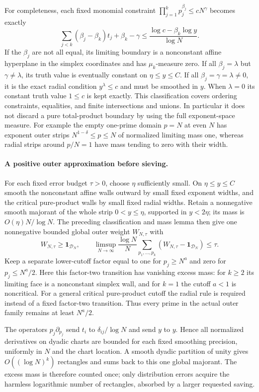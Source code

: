 For completeness, each fixed monomial constraint
$\prod_{j=1}^kp_j^{\beta_j}\le cN^\gamma$ becomes exactly
\[
 \sum_{j<k}(\beta_j-\beta_k)t_j+\beta_k-\gamma
 \le\frac{\log c-\beta_k\log y}{\log N}.
\]
If the $\beta_j$ are not all equal, its limiting boundary is a
nonconstant affine hyperplane in the simplex coordinates and has
$\mu_k$-measure zero. If all $\beta_j=\lambda$ but
$\gamma\ne\lambda$, its truth value is eventually constant on
$\eta\le y\le C$. If all $\beta_j=\gamma=\lambda\ne0$, it is
the exact radial condition $y^\lambda\le c$ and must be smoothed
in $y$. When $\lambda=0$ its constant truth value $1\le c$ is
kept exactly. This classification covers ordering constraints,
equalities, and finite intersections and unions. In particular it
does not discard a pure total-product boundary by using the full
exponent-space measure. For example the empty one-prime domain
$p=N$ at even $N$ has exponent outer strips
$N^{1-\delta}\le p\le N$ of normalized limiting mass one, whereas
radial strips around $p/N=1$ have mass tending to zero with their width.

\paragraph{A positive outer approximation before sieving.}
For each fixed error budget $\tau>0$, choose $\eta$ sufficiently
small. On $\eta\le y\le C$ smooth the nonconstant affine walls
outward by small fixed exponent widths, and the critical pure-product
walls by small fixed radial widths. Retain a nonnegative smooth
majorant of the whole strip $0<y\le\eta$, supported in $y<2\eta$;
its mass is $O(\eta)N/\log N$. The preceding classification and
mass lemma then give one nonnegative bounded global outer weight
$W_{N,\tau}$ with
\[
 W_{N,\tau}\ge\mathbf1_{\mathcal D_N},\qquad
 \limsup_{N\to\infty}\frac{\log N}{N}
       \sum_{p_1,\ldots,p_k}
        (W_{N,\tau}-\mathbf1_{\mathcal D_N})\le\tau.
\]
Keep a separate lower-cutoff factor equal to one for $p_j\ge N^a$
and zero for $p_j\le N^a/2$. Here this factor-two transition has
vanishing excess mass: for $k\ge2$ its limiting face is a
nonconstant simplex wall, and for $k=1$ the cutoff $a<1$ is
noncritical. For a general critical pure-product cutoff the radial
rule is required instead of a fixed factor-two transition.
Thus every prime in the actual outer family remains at least $N^a/2$.

The operators $p_j\partial_{p_j}$ send $t_i$ to
$\delta_{ij}/\log N$ and send $y$ to $y$. Hence all normalized
derivatives on dyadic charts are bounded for each fixed smoothing
precision, uniformly in $N$ and the chart location. A smooth dyadic
partition of unity gives $O((\log N)^k)$ rectangles and sums back
to this one global majorant. The excess mass is therefore counted
once; only distribution errors acquire the harmless logarithmic
number of rectangles, absorbed by a larger requested saving.

